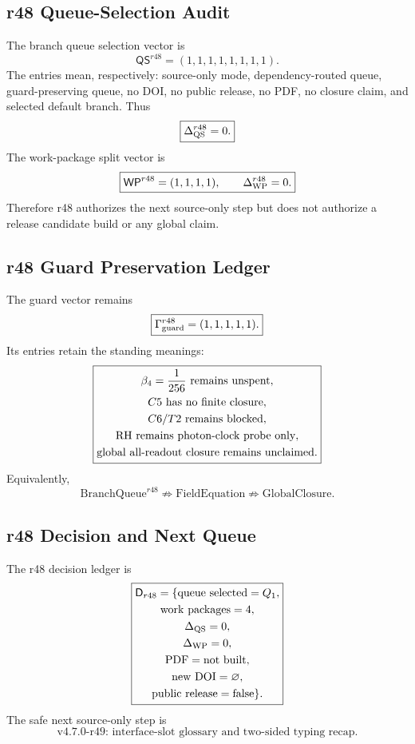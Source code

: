 \subsection{r48 Queue-Selection Audit}
\label{subsec:r48-queue-selection-audit}

The branch queue selection vector is
\[
\boxed{
\mathsf{QS}^{r48}
=
(1,1,1,1,1,1,1,1).
}
\]
The entries mean, respectively: source-only mode, dependency-routed queue,
guard-preserving queue, no DOI, no public release, no PDF, no closure claim, and
selected default branch.  Thus
\[
\boxed{
\Delta_{\rm QS}^{r48}=0.
}
\]
The work-package split vector is
\[
\boxed{
\mathsf{WP}^{r48}=(1,1,1,1),
\qquad
\Delta_{\rm WP}^{r48}=0.
}
\]
Therefore r48 authorizes the next source-only step but does not authorize a
release candidate build or any global claim.

\subsection{r48 Guard Preservation Ledger}
\label{subsec:r48-guard-preservation-ledger}

The guard vector remains
\[
\boxed{
\Gamma_{\rm guard}^{r48}=(1,1,1,1,1).
}
\]
Its entries retain the standing meanings:
\[
\boxed{
\begin{gathered}
\beta_4={1\over256}\text{ remains unspent},\\
C5\text{ has no finite closure},\\
C6/T2\text{ remains blocked},\\
\mathrm{RH}\text{ remains photon-clock probe only},\\
\text{global all-readout closure remains unclaimed}.
\end{gathered}
}
\]
Equivalently,
\[
\boxed{
\mathrm{BranchQueue}^{r48}
\not\Rightarrow
\mathrm{FieldEquation}
\not\Rightarrow
\mathrm{GlobalClosure}.
}
\]

\subsection{r48 Decision and Next Queue}
\label{subsec:r48-decision-next-queue}

The r48 decision ledger is
\[
\boxed{
\begin{gathered}
\mathsf D_{r48}
=
\{
\mathrm{queue\ selected}=Q_1,\\
\mathrm{work\ packages}=4,\\
\Delta_{\rm QS}=0,\\
\Delta_{\rm WP}=0,\\
\mathrm{PDF}=\mathrm{not\ built},\\
\mathrm{new\ DOI}=\varnothing,\\
\mathrm{public\ release}=\mathrm{false}
\}.
\end{gathered}
}
\]
The safe next source-only step is
\[
\boxed{
\text{v4.7.0-r49: interface-slot glossary and two-sided typing recap.}
}
\]



